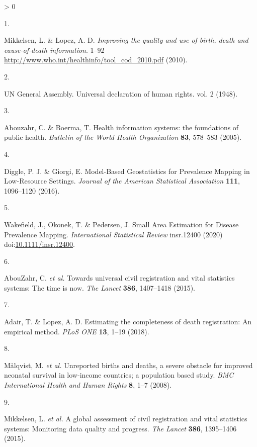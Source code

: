 \documentclass[
]{article}
\newlength{\cslhangindent}
\newlength{\csllabelwidth}
\newenvironment{CSLReferences}[2] %
 {%
  \setlength{\parindent}{0pt}
  \ifodd #1 \everypar{\setlength{\hangindent}{\cslhangindent}}\ignorespaces\fi
  \ifnum #2 > 0
  \setlength{\parskip}{#2\baselineskip}
  \fi
 }%
 {}
\newcommand{\CSLLeftMargin}[1]{\parbox[t]{\csllabelwidth}{#1}}
\newcommand{\CSLRightInline}[1]{\parbox[t]{\linewidth - \csllabelwidth}{#1}\break}
\begin{document}
\hypertarget{refs}{}
\begin{CSLReferences}{0}{0}
\leavevmode\hypertarget{ref-Mikkelsen2010}{}%
\CSLLeftMargin{1. }
\CSLRightInline{Mikkelsen, L. \& Lopez, A. D. \emph{{Improving the quality and use of birth, death and cause-of-death information}}. 1--92 \url{http://www.who.int/healthinfo/tool_cod_2010.pdf} (2010).}

\leavevmode\hypertarget{ref-srs}{}%
\CSLLeftMargin{2. }
\CSLRightInline{UN General Assembly. {Universal declaration of human rights}. vol. 2 (1948).}

\leavevmode\hypertarget{ref-Abouzahr2005}{}%
\CSLLeftMargin{3. }
\CSLRightInline{Abouzahr, C. \& Boerma, T. {Health information systems: the foundations of public health}. \emph{Bulletin of the World Health Organization} \textbf{83}, 578--583 (2005).}

\leavevmode\hypertarget{ref-Diggle2016}{}%
\CSLLeftMargin{4. }
\CSLRightInline{Diggle, P. J. \& Giorgi, E. {Model-Based Geostatistics for Prevalence Mapping in Low-Resource Settings}. \emph{Journal of the American Statistical Association} \textbf{111}, 1096--1120 (2016).}

\leavevmode\hypertarget{ref-Wakefield2020}{}%
\CSLLeftMargin{5. }
\CSLRightInline{Wakefield, J., Okonek, T. \& Pedersen, J. {Small Area Estimation for Disease Prevalence Mapping}. \emph{International Statistical Review} insr.12400 (2020) doi:\href{https://doi.org/10.1111/insr.12400}{10.1111/insr.12400}.}

\leavevmode\hypertarget{ref-AbouZahr2015}{}%
\CSLLeftMargin{6. }
\CSLRightInline{AbouZahr, C. \emph{et al.} {Towards universal civil registration and vital statistics systems: The time is now}. \emph{The Lancet} \textbf{386}, 1407--1418 (2015).}

\leavevmode\hypertarget{ref-Adair2018}{}%
\CSLLeftMargin{7. }
\CSLRightInline{Adair, T. \& Lopez, A. D. {Estimating the completeness of death registration: An empirical method}. \emph{PLoS ONE} \textbf{13}, 1--19 (2018).}

\leavevmode\hypertarget{ref-Malqvist2008}{}%
\CSLLeftMargin{8. }
\CSLRightInline{Målqvist, M. \emph{et al.} {Unreported births and deaths, a severe obstacle for improved neonatal survival in low-income countries; a population based study}. \emph{BMC International Health and Human Rights} \textbf{8}, 1--7 (2008).}

\leavevmode\hypertarget{ref-Mikkelsen2015}{}%
\CSLLeftMargin{9. }
\CSLRightInline{Mikkelsen, L. \emph{et al.} {A global assessment of civil registration and vital statistics systems: Monitoring data quality and progress}. \emph{The Lancet} \textbf{386}, 1395--1406 (2015).}


\end{CSLReferences}
\end{document}
